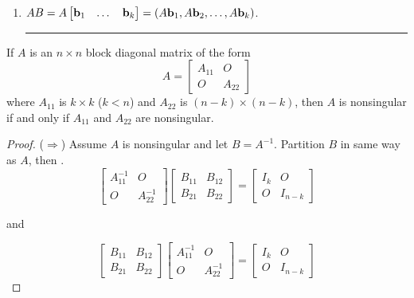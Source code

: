 \begin{enumerate}
\rule[0.01in]{\textwidth}{0.0025in}


\item $A B = A \begin{bmatrix} {\bf b}_1 & \dots & {\bf b}_k \end{bmatrix} = (A{\bf b}_1, A{\bf b}_2, \dots, A {\bf b}_k)$.




\rule[0.01in]{\textwidth}{0.0025in}


\end{enumerate}
 
 
 
 \begin{theorem}
 If $A$ is an $n \times n$ block diagonal matrix of the form
 \[  A = \begin{bmatrix}  A_{11}   &  O \\ O  &  A_{22}  \end{bmatrix} \]
 where $A_{11}$ is  $k \times k$ ($k<n$) and $A_{22}$ is $(n-k) \times (n-k)$, then $A$ is nonsingular if and only if $A_{11}$ and $A_{22}$ are nonsingular.\
 
 \begin{proof}
 	($\Rightarrow$)   Assume $A$ is nonsingular and let $B = A^{-1}$.  Partition $B$ in same way as $A$, then . 
	 \[   \begin{bmatrix}  A_{11}^{-1}   &  O \\ O  &  A_{22}^{-1}  \end{bmatrix}  \begin{bmatrix}  B_{11}   &  B_{12} \\ B_{21}  & B_{22}  \end{bmatrix}  =  \begin{bmatrix}  I_{k}   &  O \\ O  &  I_{n-k}  \end{bmatrix}   \]

	and
	 
	 \[   \begin{bmatrix}  B_{11}   &  B_{12} \\ B_{21}  & B_{22}  \end{bmatrix}   \begin{bmatrix}  A_{11}^{-1}   &  O \\ O  &  A_{22}^{-1}  \end{bmatrix}  =  \begin{bmatrix}  I_{k}   &  O \\ O  &  I_{n-k}  \end{bmatrix}   \]
	

\end{proof}
\end{theorem}
